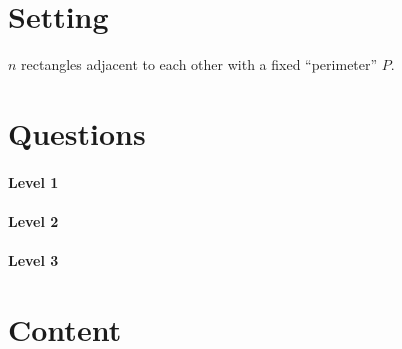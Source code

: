 \documentclass{ximera}
\begin{document}
\section{Setting}

\vfil

$n$ rectangles adjacent to each other with a fixed ``perimeter'' $P$. 

\vfil

\vfil

\newpage


\section{Questions}

\paragraph{Level 1}

\paragraph{Level 2}

\paragraph{Level 3}


\section{Content}
\end{document}
